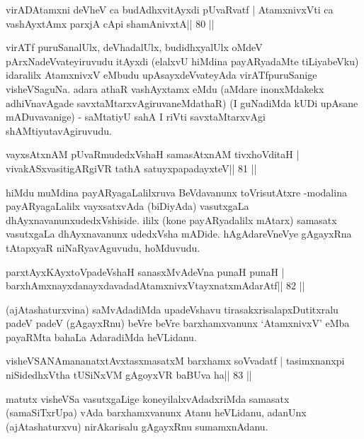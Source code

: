 
\begin{shl}
virADAtamxni deVheV ca budAdhxvitAyxdi pUvaRvatf |
AtamxnivxVti ca vashAyxtAmx parxjA cApi shamAnivxtA\hfill || 80 ||
\end{shl}

\begin{artha}
virATf puruSanalUlx, deVhadalUlx, budidhxyalUlx oMdeV  pArxNadeVvateyiruvudu itAyxdi (elalxvU hiMdina payARyadaMte  tiLiyabeVku) idaralilx AtamxnivxV eMbudu upAsayxdeVvateyAda  virATfpuruSanige visheVSaguNa. adara athaR vashAyxtamx eMdu (aMdare  inonxMdakekx adhiVnavAgade savxtaMtarxvAgiruvaneMdathaR) (I guNadiMda kUDi upAsane mADuvavanige) - saMtatiyU sahA I riVti savxtaMtarxvAgi shAMtiyutavAgiruvudu.
\end{artha}

\begin{shl}
vayxsAtxnAM pUvaRmudedxVshaH samasAtxnAM tivxhoVditaH |
vivakASxvasitigARgiVR tathA satuyxpapadayxteV\hfill || 81 ||
\end{shl}

\begin{artha}
hiMdu muMdina payARyagaLalilxruva BeVdavanunx toVrisutAtxre -\break modalina  payARyagaLalilx vayxsatxvAda (biDiyAda) vasutxgaLa dhAyxnavanunx\break udedxVshiside. ililx (kone payARyadalilx mAtarx) samasatx vasutxgaLa  dhAyxnavanunx udedxVsha mADide. hAgAdareVneVye gAgayxRna tAtapxyaR niNaRyavAguvudu, hoMduvudu.
\end{artha}

\begin{shl}
parxtAyxKAyxtoVpadeVshaH sanasxMvAdeVna punaH punaH |
barxhAmxnayxdanayxdavadadAtamxnivxVtayxnatxmAdarAtf\hfill || 82 ||
\end{shl}

\begin{artha}
(ajAtashaturxvina) saMvAdadiMda upadeVshavu tirasakxrisalapxDutitxralu padeV padeV (gAgayxRnu) beVre beVre barxhamxvanunx `AtamxnivxV' eMba payaRMta bahaLa AdaradiMda heVLidanu.
\end{artha}

\begin{shl}
visheVSANAmananatxtAvxtasxmasatxM barxhamx soV\s vadatf |
tasimxnanxpi niSidedhxV\s tha tUSiNxVM gAgoyxVR baBUva ha\hfill || 83 ||
\end{shl}

\begin{artha}
matutx visheVSa vasutxgaLige koneyilalxvAdadxriMda samasatx  (samaSiTxrUpa) vAda barxhamxvanunx Atanu heVLidanu, adanUnx (ajAtashaturxvu) nirAkarisalu gAgayxRnu sumamxnAdanu.
\end{artha}

